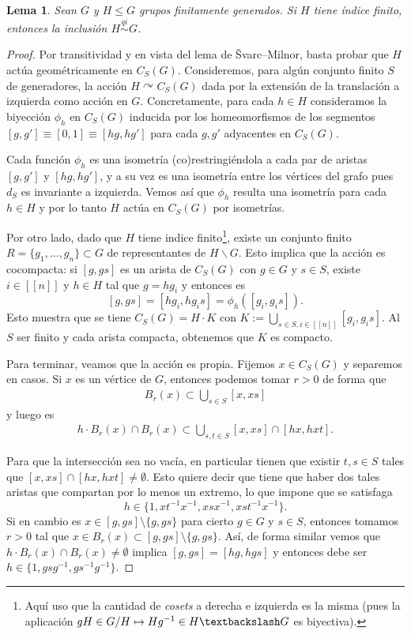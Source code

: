\documentclass[11pt]{article}
\theoremstyle{colored}
\newtheorem{lemma}{Lema}
\newcommand{\nat}[1]{[\![#1]\!]}
\newcommand{\qi}{\stackrel{qi}{\sim}}
\begin{document}
\begin{lemma} Sean $G$ y $H \leq G$ grupos finitamente generados. Si $H$ tiene índice finito, entonces la inclusión $H \qi G$.
\end{lemma}
\begin{proof} Por transitividad y en vista del lema de Švarc–Milnor, basta probar que $H$ actúa geométricamente en $C_S(G)$. Consideremos, para algún conjunto finito $S$ de generadores, la acción $H \curvearrowright C_S(G)$ dada por la extensión de la translación a izquierda como acción en $G$. Concretamente, para cada $h \in H$ consideramos la biyección $\phi_h$ en $C_S(G)$ inducida por los homeomorfismos de los segmentos $[g,g'] \equiv [0,1] \equiv [hg,hg']$ para cada $g,g'$ adyacentes en $C_S(G)$. 

Cada función $\phi_h$ es una isometría (co)restringiéndola a cada par de aristas $[g,g']$ y $[hg,hg']$, y a su vez es una isometría entre los vértices del grafo pues $d_S$ es invariante a izquierda. Vemos así que $\phi_h$ resulta una isometría para cada $h \in H$ y por lo tanto $H$ actúa en $C_S(G)$ por isometrías.

Por otro lado, dado que $H$ tiene indice finito\footnote{Aquí uso que la cantidad de \textit{cosets} a derecha e izquierda es la misma (pues la aplicación $gH \in G/H \mapsto Hg^{-1} \in H\textbackslash G$ es biyectiva).}, existe un conjunto finito $R = \{g_1, \dots, g_n\} \subset G$ de representantes de $H \backslash G$. Esto implica que la acción es cocompacta: si $[g,gs]$ es un arista de $C_S(G)$ con $g \in G$ y $s \in S$, existe $i \in \nat{n}$ y $h \in H$ tal que $g = hg_i$ y entonces es
\[
[g,gs] = [hg_i,hg_is] = \phi_h([g_i,g_is]).
\]
Esto muestra que se tiene $C_S(G) = H \cdot K$ con $K := \bigcup_{s \in S, i\in\nat{n}}[g_i,g_is]$. Al $S$ ser finito y cada arista compacta, obtenemos que $K$ es compacto.

Para terminar, veamos que la acción es propia. Fijemos $x \in C_S(G)$ y separemos en casos. Si $x$ es un vértice de $G$, entonces podemos tomar $r > 0$ de forma que
\begin{align*}
B_r(x) \subset \bigcup_{s \in S}[x,xs]
\end{align*}
y luego es
\begin{align*}
h \cdot B_r(x) \cap B_r(x) \subset \bigcup_{s,t \in S} [x,xs] \cap [hx,hxt].
\end{align*}

Para que la intersección sea no vacía, en particular tienen que existir $t,s \in S$ tales que $[x,xs] \cap [hx,hxt] \neq \emptyset$. Esto quiere decir que tiene que haber dos tales aristas que compartan por lo menos un extremo, lo que impone que se satisfaga
\[
h \in \{1,xt^{-1}x^{-1},xsx^{-1},xst^{-1}x^{-1}\}.
\]
Si en cambio es $x \in [g,gs] \setminus \{g,gs\}$ para cierto $g \in G$ y $s \in S$, entonces tomamos $r > 0$ tal que $x \in B_r(x) \subset [g,gs] \setminus \{g,gs\}$. Así, de forma similar vemos que $h \cdot B_r(x) \cap B_r(x) \neq \emptyset$ implica $[g,gs] = [hg,hgs]$ y entonces debe ser $h \in \{1,gsg^{-1},gs^{-1}g^{-1}\}$.


\end{proof}
\end{document}

